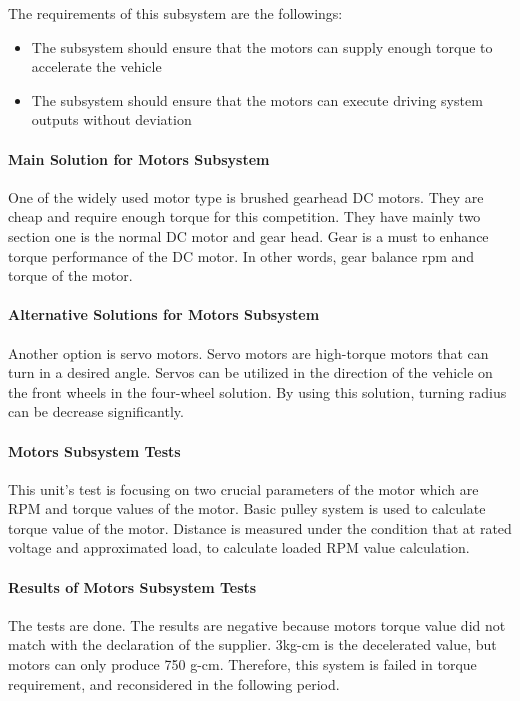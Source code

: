 \documentclass[a4paper,12pt]{article}
\begin{document}
	The requirements of this subsystem are the followings:
	\begin{itemize}
		\item The subsystem should ensure that the motors can supply enough torque to accelerate the vehicle 
		\item The subsystem should ensure that the motors can execute driving system outputs without deviation
	\end{itemize}
	
	\paragraph{Main Solution for Motors Subsystem}
	One of the widely used motor type is brushed gearhead DC motors. They are cheap and require enough torque for this competition. They have mainly two section one is the normal DC motor and gear head. Gear is a must to enhance torque performance of the DC motor. In other words, gear balance rpm and torque of the motor. 
	 
	\paragraph{Alternative Solutions for Motors Subsystem}
	Another option is servo motors. Servo motors are high-torque motors that can turn in a desired angle. Servos can be utilized in the direction of the vehicle on the front wheels in the four-wheel solution. By using this solution, turning radius can be decrease significantly.
	 
	\paragraph{Motors Subsystem Tests}
	This unit’s test is focusing on two crucial parameters of the motor which are RPM and torque values of the motor. 
	Basic pulley system is used to calculate torque value of the motor.
	Distance is measured under the condition that at rated voltage and approximated load, to calculate loaded RPM value calculation.
	
	\paragraph{Results of Motors Subsystem Tests}
	The tests are done. The results are negative because motors torque value did not match with the declaration of the supplier. 3kg-cm is the decelerated value, but motors can only produce 750 g-cm. Therefore, this system is failed in torque requirement, and reconsidered in the following period. \\
	
\end{document}
